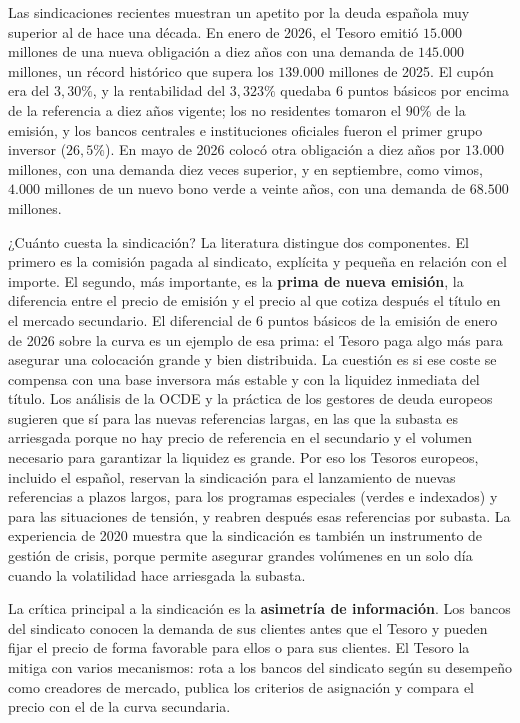 \documentclass[10pt,a4paper]{article}
\begin{document}
Las sindicaciones recientes muestran un apetito por la deuda española muy superior al de hace una década. En enero de 2026, el Tesoro emitió $15.000$ millones de una nueva obligación a diez años con una demanda de $145.000$ millones, un récord histórico que supera los $139.000$ millones de 2025. El cupón era del $3,30\%$, y la rentabilidad del $3,323\%$ quedaba $6$ puntos básicos por encima de la referencia a diez años vigente; los no residentes tomaron el $90\%$ de la emisión, y los bancos centrales e instituciones oficiales fueron el primer grupo inversor ($26,5\%$). En mayo de 2026 colocó otra obligación a diez años por $13.000$ millones, con una demanda diez veces superior, y en septiembre, como vimos, $4.000$ millones de un nuevo bono verde a veinte años, con una demanda de $68.500$ millones.

¿Cuánto cuesta la sindicación? La literatura distingue dos componentes. El primero es la comisión pagada al sindicato, explícita y pequeña en relación con el importe. El segundo, más importante, es la \textbf{prima de nueva emisión}, la diferencia entre el precio de emisión y el precio al que cotiza después el título en el mercado secundario. El diferencial de $6$ puntos básicos de la emisión de enero de 2026 sobre la curva es un ejemplo de esa prima: el Tesoro paga algo más para asegurar una colocación grande y bien distribuida. La cuestión es si ese coste se compensa con una base inversora más estable y con la liquidez inmediata del título. Los análisis de la OCDE y la práctica de los gestores de deuda europeos sugieren que sí para las nuevas referencias largas, en las que la subasta es arriesgada porque no hay precio de referencia en el secundario y el volumen necesario para garantizar la liquidez es grande. Por eso los Tesoros europeos, incluido el español, reservan la sindicación para el lanzamiento de nuevas referencias a plazos largos, para los programas especiales (verdes e indexados) y para las situaciones de tensión, y reabren después esas referencias por subasta. La experiencia de 2020 muestra que la sindicación es también un instrumento de gestión de crisis, porque permite asegurar grandes volúmenes en un solo día cuando la volatilidad hace arriesgada la subasta.

La crítica principal a la sindicación es la \textbf{asimetría de información}. Los bancos del sindicato conocen la demanda de sus clientes antes que el Tesoro y pueden fijar el precio de forma favorable para ellos o para sus clientes. El Tesoro la mitiga con varios mecanismos: rota a los bancos del sindicato según su desempeño como creadores de mercado, publica los criterios de asignación y compara el precio con el de la curva secundaria.
\end{document}
